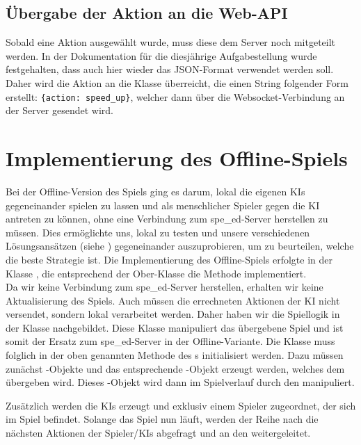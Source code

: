 \subsection{Übergabe der Aktion an die Web-API}
\label{subsec:uebergabe-aktion}

Sobald eine Aktion ausgewählt wurde, muss diese dem Server noch mitgeteilt werden.
In der Dokumentation für die diesjährige Aufgabestellung wurde festgehalten, dass auch hier wieder das JSON-Format
verwendet werden soll.
Daher wird die Aktion an die Klasse  überreicht, die einen String folgender Form erstellt:
\texttt{\{\dq action\dq : \dq speed\_up\dq \}}, welcher dann über die Websocket-Verbindung an der Server gesendet wird.

\section{Implementierung des Offline-Spiels}
\label{sec:offline-implementierung}

Bei der Offline-Version des Spiels ging es darum, lokal die eigenen \ac{KI}s gegeneinander spielen zu lassen und
als menschlicher Spieler gegen die \ac{KI} antreten zu können, ohne eine Verbindung zum spe\_ed-Server herstellen zu
müssen.
Dies ermöglichte uns, lokal zu testen und unsere verschiedenen Lösungsansätzen (siehe )
gegeneinander auszuprobieren, um zu beurteilen, welche die beste Strategie ist.
Die Implementierung des Offline-Spiels erfolgte in der Klasse , die entsprechend der Ober-Klasse
 die Methode  implementiert. \\

Da wir keine Verbindung zum spe\_ed-Server herstellen, erhalten wir keine Aktualisierung des Spiels.
Auch müssen die errechneten Aktionen der \ac{KI} nicht versendet, sondern lokal verarbeitet werden.
Daher haben wir die Spiellogik in der Klasse  nachgebildet.
Diese Klasse manipuliert das übergebene Spiel und ist somit der Ersatz zum spe\_ed-Server in der Offline-Variante.
Die Klasse  muss folglich in der oben genannten Methode  des s
initialisiert werden.
Dazu müssen zunächst -Objekte und das entsprechende -Objekt erzeugt werden, welches dem
 übergeben wird.
Dieses -Objekt wird dann im Spielverlauf durch den  manipuliert.

Zusätzlich werden die \ac{KI}s erzeugt und exklusiv einem Spieler zugeordnet, der sich im Spiel befindet.
Solange das Spiel nun läuft, werden der Reihe nach die nächsten Aktionen der
Spieler/\ac{KI}s abgefragt und an den  weitergeleitet.

